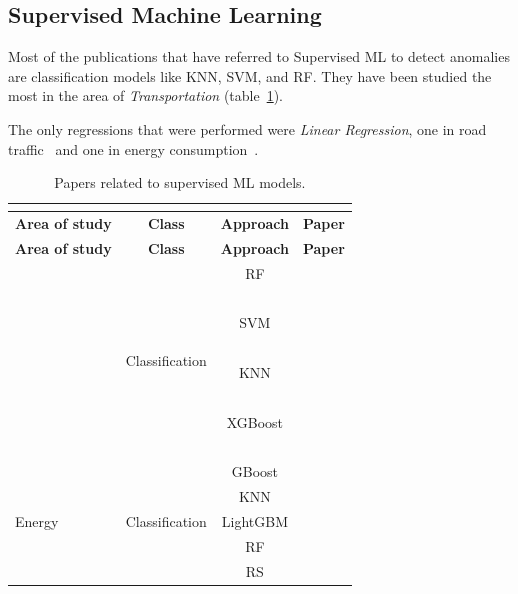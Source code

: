 \documentclass[a4paper,12pt,twoside]{ThesisStyle}
\begin{document}
\subsection{Supervised Machine Learning}

Most of the publications that have referred to Supervised ML to detect anomalies are classification models like KNN, SVM, and RF. They have been studied the most in the area of \textit{Transportation} (table~\ref{taula:PSMLM}). 

The only regressions that were performed were \textit{Linear Regression}, one in road traffic~\cite{mondal2020road} and one in energy consumption~\cite{leiria2021using}. 

\renewcommand{\arraystretch}{1.5}
\begin{longtable}{  l  c  c  l  }
\caption{Papers related to supervised ML models.}  \\
\label{taula:PSMLM}  \\
\hline
  \textbf{Area of study} & \textbf{Class} & \textbf{Approach} & \textbf{Paper} \\
\hline 
\endfirsthead
 \hline
  \textbf{Area of study} & \textbf{Class} & \textbf{Approach} & \textbf{Paper} \\
\hline 
\endhead
\hline
\endfoot
\multirow{8}{*}{CyberSecurity} & \multirow{8}{*}{Classification}  & RF & ~\cite{saranya2020performance} \\
\cline{3-4} 
 &  & \multirow{3}{*}{SVM} & ~\cite{el2014multicriterion} \\
 &  &  & ~\cite{Xu2019outlier}\\
 &  &  & ~\cite{bukhari2023anomaly}\\
 \cline{3-4} 
 &  & KNN & ~\cite{protic2022cybersecurity} \\
 \cline{3-4} 
 &  & \multirow{3}{*}{XGBoost} & ~\cite{karanfilovska2022analysis} \\
  &  & & ~\cite{saheed2022machine} \\
  &  & & ~\cite{yadav2023augmentation} \\
\hline
\multirow{6}{*}{Energy} & \multirow{5}{*}{Classification}  & GBoost & ~\cite{ali2020data} \\
\cline{3-4} 
 &  & KNN & ~\cite{himeur2020data} \\
 \cline{3-4} 
 &  & LightGBM & ~\cite{moon2022toward} \\
 \cline{3-4} 
 &  & RF & ~\cite{cerquitelli2017predicting} \\
 \cline{3-4} 
 &  & RS & ~\cite{alsalemi2023modular} \\

\end{longtable}
\end{document}
